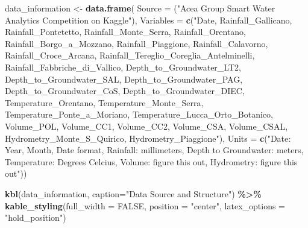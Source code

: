 \documentclass[
]{article}
\newenvironment{Shaded}{\begin{snugshade}}{\end{snugshade}}
\newcommand{\AttributeTok}[1]{\textcolor[rgb]{0.13,0.29,0.53}{#1}}
\newcommand{\ConstantTok}[1]{\textcolor[rgb]{0.56,0.35,0.01}{#1}}
\newcommand{\FunctionTok}[1]{\textcolor[rgb]{0.13,0.29,0.53}{\textbf{#1}}}
\newcommand{\NormalTok}[1]{#1}
\newcommand{\OtherTok}[1]{\textcolor[rgb]{0.56,0.35,0.01}{#1}}
\newcommand{\SpecialCharTok}[1]{\textcolor[rgb]{0.81,0.36,0.00}{\textbf{#1}}}
\newcommand{\StringTok}[1]{\textcolor[rgb]{0.31,0.60,0.02}{#1}}
\begin{document}
\begin{Shaded}
\begin{Highlighting}[]
\NormalTok{data\_information }\OtherTok{\textless{}{-}} \FunctionTok{data.frame}\NormalTok{(}
  \AttributeTok{Source =}\NormalTok{ (}\StringTok{"Acea Group Smart Water Analytics Competition on Kaggle"}\NormalTok{),}
  \AttributeTok{Variables =} \FunctionTok{c}\NormalTok{(}\StringTok{"Date, Rainfall\_Gallicano, Rainfall\_Pontetetto, Rainfall\_Monte\_Serra,}
\StringTok{                Rainfall\_Orentano, Rainfall\_Borgo\_a\_Mozzano, Rainfall\_Piaggione,}
\StringTok{                Rainfall\_Calavorno, Rainfall\_Croce\_Arcana, }
\StringTok{                Rainfall\_Tereglio\_Coreglia\_Antelminelli, Rainfall\_Fabbriche\_di\_Vallico, }
\StringTok{                Depth\_to\_Groundwater\_LT2, Depth\_to\_Groundwater\_SAL, Depth\_to\_Groundwater\_PAG, }
\StringTok{                Depth\_to\_Groundwater\_CoS, Depth\_to\_Groundwater\_DIEC, Temperature\_Orentano, }
\StringTok{                Temperature\_Monte\_Serra, Temperature\_Ponte\_a\_Moriano, }
\StringTok{                Temperature\_Lucca\_Orto\_Botanico, Volume\_POL, Volume\_CC1, Volume\_CC2, }
\StringTok{                Volume\_CSA, Volume\_CSAL, Hydrometry\_Monte\_S\_Quirico, Hydrometry\_Piaggione"}\NormalTok{),}
  \AttributeTok{Units =} \FunctionTok{c}\NormalTok{(}\StringTok{"Date: Year, Month, Date format, Rainfall: millimeters, Depth to Groundwater: }
\StringTok{                meters, Temperature: Degrees Celcius, Volume: figure this out, Hydrometry:}
\StringTok{                figure this out"}\NormalTok{))}

\FunctionTok{kbl}\NormalTok{(data\_information, }\AttributeTok{caption=}\StringTok{"Data Source and Structure"}\NormalTok{) }\SpecialCharTok{\%\textgreater{}\%} 
  \FunctionTok{kable\_styling}\NormalTok{(}\AttributeTok{full\_width =} \ConstantTok{FALSE}\NormalTok{, }
                \AttributeTok{position =} \StringTok{"center"}\NormalTok{,}
                \AttributeTok{latex\_options =} \StringTok{"hold\_position"}\NormalTok{)}
\end{Highlighting}
\end{Shaded}
\end{document}
